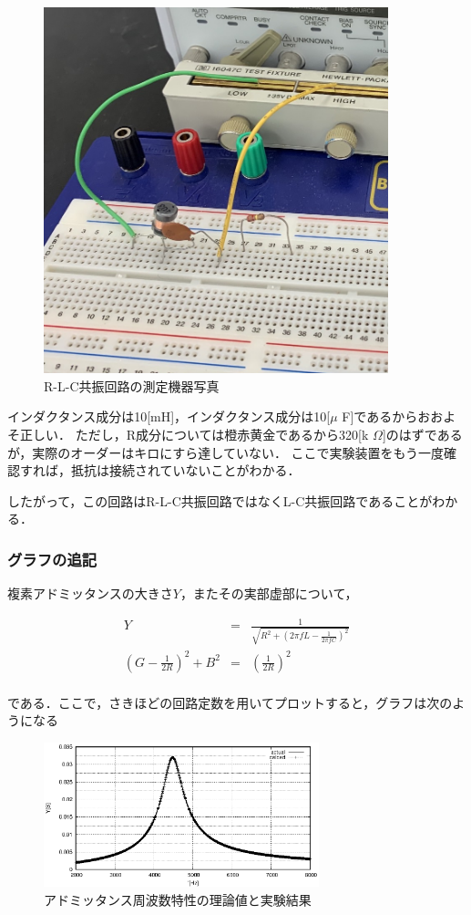 \documentclass[dvipdfmx,titlepage,a4j]{jsarticle}  %
\numberwithin{equation}{section}
\begin{document}
\begin{figure}[H]
  \centering
  \includegraphics[width=10cm]{../photo/rcl.jpg}
  \caption{R-L-C共振回路の測定機器写真}
  \label{fig:rcl.jpg}
\end{figure}

インダクタンス成分は10[mH]，インダクタンス成分は10[$\mu$ F]であるからおおよそ正しい．
ただし，R成分については橙赤黄金であるから320[k $\Omega$]のはずであるが，実際のオーダーはキロにすら達していない．
ここで実験装置をもう一度確認すれば，抵抗は接続されていないことがわかる．

したがって，この回路はR-L-C共振回路ではなくL-C共振回路であることがわかる．

\subsubsection{グラフの追記}
複素アドミッタンスの大きさ$Y$，またその実部虚部について，

\begin{eqnarray}
  Y &=& \frac{1}{\sqrt{R^2 + \left(2\pi f L - \frac{1}{2\pi f C}\right)^2}}\\
  \left(G - \frac{1}{2R}\right)^2 + B^2 &=& \left(\frac{1}{2R}\right)^2\\
\end{eqnarray}

である．ここで，さきほどの回路定数を用いてプロットすると，グラフは次のようになる

\begin{figure}[H]
  \centering
  \includegraphics[width=8cm]{../gnuplot/A_YTheta_2.eps}
  \caption{アドミッタンス周波数特性の理論値と実験結果}
  \label{fig:A_YTheta_2.eps}
\end{figure}
\end{document}
